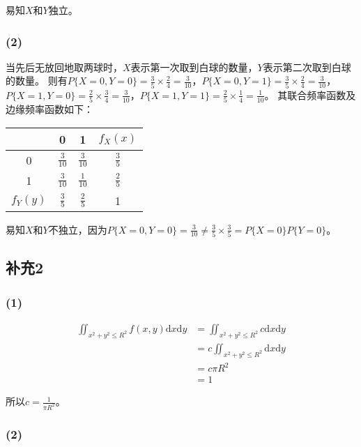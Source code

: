 \documentclass[a4paper,12pt]{ctexart}
\begin{document}
易知$X$和$Y$独立。

\subsubsection*{(2)}

当先后无放回地取两球时，$X$表示第一次取到白球的数量，$Y$表示第二次取到白球的数量。
则有$P\{X = 0, Y = 0\} = \frac{3}{5}\times\frac{2}{4} = \frac{3}{10}$，$P\{X = 0, Y = 1\} = \frac{3}{5}\times\frac{2}{4} = \frac{3}{10}$，$P\{X = 1, Y = 0\} = \frac{2}{5}\times\frac{3}{4} = \frac{3}{10}$，$P\{X = 1, Y = 1\} = \frac{2}{5}\times\frac{1}{4} = \frac{1}{10}$。
其联合频率函数及边缘频率函数如下：
\begin{center}
	\begin{tabular}{c|cc|c}
		\diagbox{$X$}{$Y$} & 0 & 1 & $f_X(x)$ \\
		\hline
		0 & $\frac{3}{10}$ & $\frac{3}{10}$ & $\frac{3}{5}$ \\
		1 & $\frac{3}{10}$ & $\frac{1}{10}$ & $\frac{2}{5}$ \\
		\hline
		$f_Y(y)$ & $\frac{3}{5}$ & $\frac{2}{5}$ & 1
	\end{tabular}
\end{center}

易知$X$和$Y$不独立，因为$P\{X = 0, Y = 0\} = \frac{3}{10} \neq \frac{3}{5}\times\frac{3}{5} = P\{X = 0\}P\{Y = 0\}$。

\subsection*{补充2}

\subsubsection*{(1)}

\begin{align*}
	\iint_{x^2 + y^2 \leq R^2} f(x,y) \mathrm{d}x \mathrm{d}y &= \iint_{x^2 + y^2 \leq R^2} c \mathrm{d}x \mathrm{d}y \\
	&= c \iint_{x^2 + y^2 \leq R^2} \mathrm{d}x \mathrm{d}y \\
	&= c \pi R^2 \\
	&= 1
\end{align*}

所以$c = \frac{1}{\pi R^2}$。

\subsubsection*{(2)}
\end{document}
